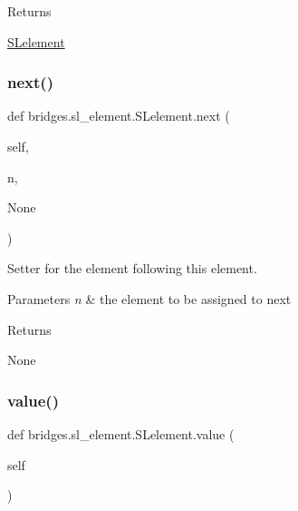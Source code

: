 \begin{DoxyReturn}{Returns}


\hyperlink{classbridges_1_1sl__element_1_1_s_lelement}{S\+Lelement} 
\end{DoxyReturn}
\mbox{\label{classbridges_1_1sl__element_1_1_s_lelement_af7cdff0e4a93e1fbbcb7f92741fe4c7b}} 
\subsubsection{\texorpdfstring{next()}{next()}\hspace{0.1cm}{\footnotesize\ttfamily [2/2]}}
{\footnotesize\ttfamily def bridges.\+sl\+\_\+element.\+S\+Lelement.\+next (\begin{DoxyParamCaption}\item[{}]{self,  }\item[{}]{n,  }\item[{}]{None }\end{DoxyParamCaption})}



Setter for the element following this element. 


\begin{DoxyParams}{Parameters}
{\em n} & the element to be assigned to next \\
\hline
\end{DoxyParams}
\begin{DoxyReturn}{Returns}


None 
\end{DoxyReturn}
\mbox{\label{classbridges_1_1sl__element_1_1_s_lelement_a64ede02c56a4efaaa4c64a245bd01dd0}} 
\subsubsection{\texorpdfstring{value()}{value()}\hspace{0.1cm}{\footnotesize\ttfamily [1/2]}}
{\footnotesize\ttfamily def bridges.\+sl\+\_\+element.\+S\+Lelement.\+value (\begin{DoxyParamCaption}\item[{}]{self }\end{DoxyParamCaption})}



